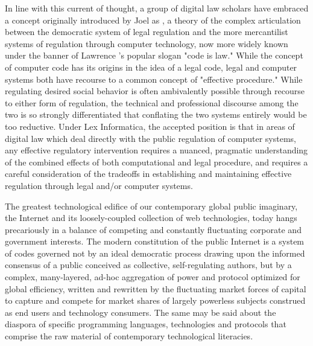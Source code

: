 In line with this current of thought, a group of digital law scholars have embraced a concept originally introduced by Joel \citeauthor{Reidenberg1998} as , a theory of the complex articulation between the democratic system of legal regulation and the more mercantilist systems of regulation through computer technology, now more widely known under the banner of Lawrence \citeauthor{Lessig99}'s popular slogan "code is law." While the concept of computer code has its origins in the idea of a legal code, legal and computer systems both have recourse to a common concept of "effective procedure." While regulating desired social behavior is often ambivalently possible through recourse to either form of regulation, the technical and professional discourse among the two is so strongly differentiated that conflating the two systems entirely would be too reductive. Under Lex Informatica, the accepted position is that in areas of digital law which deal directly with the public regulation of computer systems, any effective regulatory intervention requires a nuanced, pragmatic understanding of the combined effects of both computational and legal procedure, and requires a careful consideration of the tradeoffs in establishing and maintaining effective regulation through legal and/or computer systems.

The greatest technological edifice of our contemporary global public imaginary, the Internet and its loosely-coupled collection of web technologies, today hangs precariously in a balance of competing and constantly fluctuating corporate and government interests. The modern constitution of the public Internet is a system of codes governed not by an ideal democratic process drawing upon the informed consensus of a public conceived as collective, self-regulating authors, but by a complex, many-layered, ad-hoc aggregation of power and protocol optimized for global efficiency, written and rewritten by the fluctuating market forces of capital to capture and compete for market shares of largely powerless subjects construed as end users and technology consumers. The same may be said about the diaspora of specific programming languages, technologies and protocols that comprise the raw material of contemporary technological literacies.

